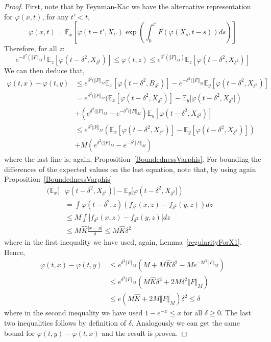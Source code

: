 \documentclass[a4paper,12pt]{article}
\newcommand{\EE}{\mathbb{E}}
\newcommand{\1}{{\bf {1}}}
\begin{document}
\begin{proof}
First, note that by Feynman-Kac we have the alternative representation for $\varphi(x,t)$, for any $t'<t$,
\[ \varphi(x,t) = \EE_x[ \varphi(t-t',X_{t'}) \exp( \int_0^{t'} F(\varphi(X_s,t-s)) ds ) ] \]
Therefore, for all $z$:
\[ e^{-\delta^2(\Vert F \Vert_{M})}\mathbb{E}_z[  \varphi(t-\delta^2,X_{\delta^2})] \leq  \varphi(t,z) \leq e^{\delta^2(\Vert F \Vert_{M})} \mathbb{E}_z[  \varphi(t-\delta^2,X_{\delta^2})] \]
We can then deduce that,
\begin{align*}
\varphi(t,x)-\varphi(t,y) &\leq e^{\delta^2(\Vert F \Vert_{M}}\mathbb{E}_x[ \varphi(t-\delta^2,B_{\delta^2})] - e^{-\delta^2(\Vert F \Vert_{M}}\mathbb{E}_y[ \varphi(t-\delta^2,X_{\delta^2})] \\ & = e^{\delta^2(\Vert F \Vert_{M}}(\mathbb{E}_x[ \varphi(t-\delta^2,X_{\delta^2})]- \mathbb{E}_y[ \varphi(t-\delta^2,X_{\delta^2}]) \\ &+ (e^{\delta^2(\Vert F \Vert_{M}} - e^{-\delta^2(\Vert F \Vert_{M}}  )\mathbb{E}_y[ \varphi(t-\delta^2,X_{\delta^2})] \\&\leq e^{\delta^2\Vert F \Vert_{M}} (\mathbb{E}_x[ \varphi(t-\delta^2,X_{\delta^2})]- \mathbb{E}_y[ \varphi(t-\delta^2,X_{\delta^2})])\\ &+ M(e^{\delta^2(\Vert F \Vert_{M}}-e^{-\delta^2\Vert F \Vert_{M}})
\end{align*}
where the last line is, again, Proposition~\ref{BoundednessVarphis}. For bounding the differences of the expected values on the last equation, note that, by using again Proposition~\ref{BoundednessVarphis}
\begin{align*}
(\mathbb{E}_x[ &\varphi(t-\delta^2,X_{\delta^2})]- \mathbb{E}_y[ \varphi(t-\delta^2,X_{\delta^2}]) & \\ & = \int \varphi(t-\delta^2,z) (f_{\delta^2}(x,z)-f_{\delta^2}(y,z) ) dz  \\ &\leq M \int |f_{\delta^2}(x,z)-f_{\delta^2}(y,z) | dz \\ &\leq M \widehat{K} \frac{|x-y|}{\delta}  \leq M \widehat{K} \delta^2 
\end{align*}
where in the first inequality we have used, again, Lemma~\ref{regularityForX1}. Hence,
\begin{align*}
\varphi(t,x)-\varphi(t,y)&\leq e^{\delta^2 \Vert F \Vert_{M}} \left(M+M \widehat{K}\delta^2 - M e^{-2\delta^2\Vert F \Vert_{M}}  \right) \\ & \leq e^{\delta^2 \Vert F \Vert_{M}}\left(M \widehat{K}\delta^2 + 2 M \delta^2\Vert F \Vert_{M}  \right) \\ &\leq e \left( M \widehat{K}+2 M \Vert F \Vert_M  \right) \delta^2 \leq  \delta
\end{align*}
where in the second inequality we have used $1-e^{-x} \leq x$ for all $\delta \geq 0$. The last two inequalities follows by definition of $\delta$. Analogously we can get the same bound for $\varphi(t,y)-\varphi(t,x)$ and the result is proven.
\end{proof}
\end{document}
